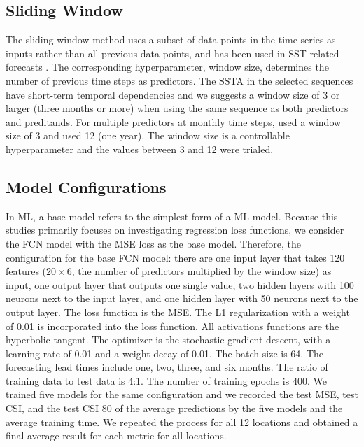 \documentclass[11pt, a4paper]{article}
\begin{document}
\subsection{Sliding Window}

The sliding window method uses a subset of data points in the time series as inputs rather than all previous data points, and has been used in SST-related forecasts \citep{ham2019deep,taylor2022deep}. The corresponding hyperparameter, window size, determines the number of previous time steps as predictors. The SSTA in the selected sequences have short-term temporal dependencies and we suggests a window size of 3 or larger (three months or more) when using the same sequence as both predictors and preditands. For multiple predictors at monthly time steps, \citet{ham2019deep} used a window size of 3 and \citet{taylor2022deep} used 12 (one year). The window size is a controllable hyperparameter and the values between 3 and 12 were trialed.

\subsection{Model Configurations}\label{subsec:modelconfig}

In ML, a base model refers to the simplest form of a ML model. Because this studies primarily focuses on investigating regression loss functions, we consider the FCN model with the MSE loss as the base model. Therefore, the configuration for the base FCN model: there are one input layer that takes 120 features ($20\times6$, the number of predictors multiplied by the window size) as input, one output layer that outputs one single value, two hidden layers with 100 neurons next to the input layer, and one hidden layer with 50 neurons next to the output layer. The loss function is the MSE. The L1 regularization with a weight of 0.01 is incorporated into the loss function. All activations functions are the hyperbolic tangent. The optimizer is the stochastic gradient descent, with a learning rate of 0.01 and a weight decay of 0.01. The batch size is 64. The forecasting lead times include one, two, three, and six months. The ratio of training data to test data is 4:1. The number of training epochs is 400. We trained five models for the same configuration and we recorded the test MSE, test CSI, and the test CSI 80 of the average predictions by the five models and the average training time. We repeated the process for all 12 locations and obtained a final average result for each metric for all locations.
\end{document}
